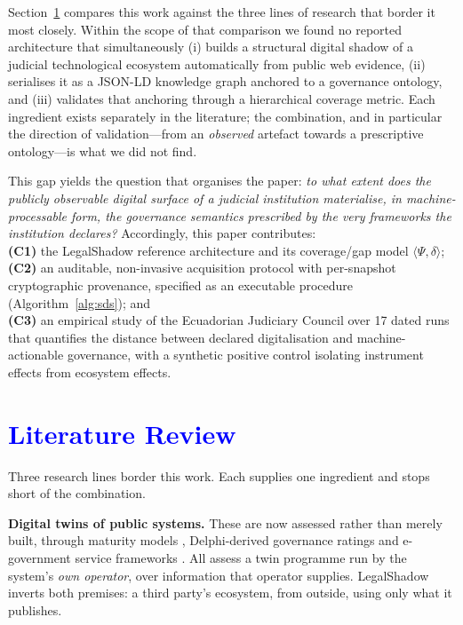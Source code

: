 \documentclass[engproc,proceedingpaper,submit,moreauthors]{Definitions/mdpi}
\begin{document}
    Section~\ref{sec:related} compares this work against the three lines of research that border it most closely. Within the scope of that comparison we found no reported architecture that simultaneously 
    (i) builds a structural digital shadow of a judicial technological ecosystem automatically from public web evidence, 
    (ii) serialises it as a JSON-LD knowledge graph anchored to a governance ontology, and 
    (iii) validates that anchoring through a hierarchical coverage metric. Each ingredient exists separately in the literature; the combination, and in particular the direction of validation---from an \emph{observed} artefact towards a prescriptive ontology---is what we did not find.

    This gap yields the question that organises the paper: \emph{to what extent does the publicly observable digital surface of a judicial institution materialise, in machine-processable form, the governance semantics prescribed by the very frameworks the institution declares?} Accordingly, this paper contributes: 
    \\\textbf{(C1)} the LegalShadow reference architecture and its coverage/gap model $\langle\Psi,\delta\rangle$; 
    \\\textbf{(C2)} an auditable, non-invasive acquisition protocol with per-snapshot cryptographic provenance, specified as an executable procedure (Algorithm~\ref{alg:sds}); and 
    \\\textbf{(C3)} an empirical study of the Ecuadorian Judiciary Council over 17 dated runs that quantifies the distance between declared digitalisation and machine-actionable governance, with a synthetic positive control isolating instrument effects from ecosystem effects.

\section{\textcolor{blue}{Literature Review}}
\label{sec:related}
    Three research lines border this work. Each supplies one ingredient and stops short of the combination.

    \textbf{Digital twins of public systems.} These are now assessed rather than merely built, through maturity models \cite{Haraguchi2024}, Delphi-derived governance ratings \cite{DiazSarachaga2025} and e-government service frameworks \cite{Anshari2022}. All assess a twin programme run by the system's \emph{own operator}, over information that operator supplies. LegalShadow inverts both premises: a third party's ecosystem, from outside, using only what it publishes.
\end{document}
